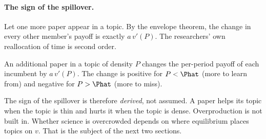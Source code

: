 \paragraph{The sign of the spillover.} Let one more paper appear in a topic. By the
envelope theorem, the change in every other member's payoff is exactly
$a\,v'(P)$. The researchers' own reallocation of time is second order.

\begin{proposition}\label{prop:externality}
An additional paper in a topic of density $P$ changes the per-period payoff of
each incumbent by $a\,v'(P)$. The change is positive for $P<\Phat$ (more to
learn from) and negative for $P>\Phat$ (more to miss).
\end{proposition}

The sign of the spillover is therefore \emph{derived}, not assumed. A paper
helps its topic when the topic is thin and hurts it when the topic is dense.
Overproduction is not built in. Whether science is overcrowded depends on
where equilibrium places topics on $v$. That is the subject of the next two
sections.
